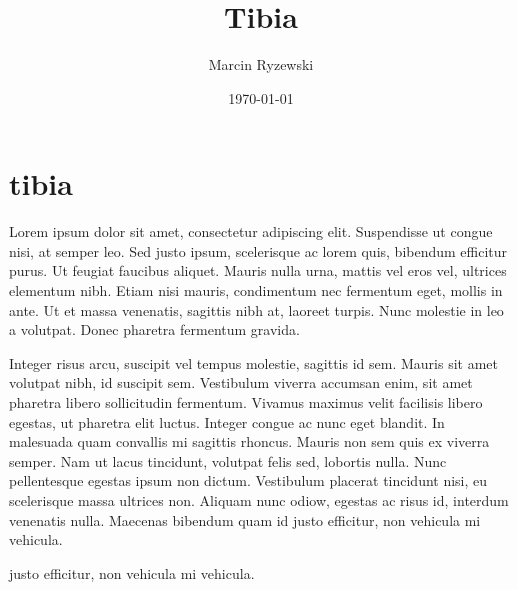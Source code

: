 \documentclass{article}
\begin{document}
\title{Tibia}
\author{Marcin Ryzewski}
\date{\today}
\maketitle  

\section{tibia}

Lorem ipsum dolor sit amet, consectetur adipiscing elit. 
Suspendisse ut congue nisi, at semper leo. Sed justo ipsum, 
scelerisque ac lorem quis, bibendum efficitur purus. 
Ut feugiat faucibus aliquet. Mauris nulla urna, mattis vel 
eros vel, ultrices elementum nibh. Etiam nisi mauris, 
condimentum nec fermentum eget, mollis in ante. Ut et 
massa venenatis, sagittis nibh at, laoreet turpis. Nunc molestie 
in leo a volutpat. Donec pharetra fermentum gravida.

Integer risus arcu, suscipit vel tempus molestie, 
sagittis id sem. Mauris sit amet volutpat nibh, id suscipit sem. 
Vestibulum viverra accumsan enim, sit amet pharetra libero 
sollicitudin fermentum. Vivamus maximus velit facilisis libero 
egestas, ut pharetra elit luctus. Integer congue ac nunc eget 
blandit. In malesuada quam convallis mi sagittis rhoncus. Mauris non 
sem quis ex viverra semper. Nam ut lacus tincidunt, volutpat felis sed, 
lobortis nulla. Nunc pellentesque egestas ipsum non dictum. Vestibulum 
placerat tincidunt nisi, eu scelerisque massa ultrices non. Aliquam nunc odiow,
egestas ac risus id, interdum venenatis nulla. Maecenas bibendum quam id 
justo efficitur, non vehicula mi vehicula.


justo efficitur, non vehicula mi vehicula.
\end{document}
